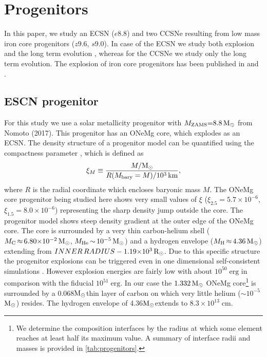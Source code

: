 \documentclass[fleqn,usenatbib]{mnras}
\newcommand{\solr}{\xspace\ensuremath{\rm{R_{\odot}}}}
\newcommand{\solm}{\xspace\ensuremath{\rm{M_{\odot}}}}
\begin{document}
\section{Progenitors}
In this paper, we study an ECSN ($e8.8$) and two  CCSNe resulting from low mass iron core  progenitors ($z9.6$, $s9.0$). In case of the ECSN we study both explosion and the long term evolution , whereas for the CCSNe we study only the long term evolution. The explosion of iron core progenitors has been published in \cite{Melson2015a} and \cite{Melson2019}. 

\subsection{ESCN progenitor}
For this study we use a solar metallicity progenitor with $M_{\rm ZAMS}\mathord{=}8.8\,\solm$ from Nomoto (2017). This progenitor has an ONeMg core, which explodes as an ECSN. The density structure of a progenitor model can be quantified using the compactness parameter \citep{Oconnor2011}, which is defined as
\begin{equation}
\label{equ:compactness}
  \xi_{M} \equiv \frac{M/\solm}{R(M_{\rm bary}=M)/10^{3}\, \rm km},
\end{equation}
where $R$ is the radial coordinate which encloses baryonic mass $M$. The ONeMg core progenitor being studied here shows very small values of $\xi$ ($\xi_{2.5}=5.7\times10^{-6}$, $\xi_{1.5}=8.0\times10^{-6}$)  representing the sharp density jump outside the core. The progenitor model shows steep density gradient at the outer edge of the ONeMg core. The core is surrounded by a very thin carbon-helium shell ($M_{\rm C}\,\mathord{\approx}\, 6.80\mathord{\times}10^{-2}\, \solm$, $M_{\rm He}\,\mathord{\sim}\,10^{-5}\, \solm$) and a hydrogen envelope ($M_{\rm H}\,\mathord{\approx}\, 4.36\, \solm$) extending from $INNER\, RADIUS- \mathord{1.19}\mathord{\times}10^{3}\, \solr$.
Due to this specific structure the progenitor explosions can be triggered even in one dimensional self-consistent simulations \citet{VonGroote, Kitaura2006}. However explosion energies are fairly low with about $10^{50}\;\mathrm{erg}$ in comparison with the fiducial $10^{51}\;\mathrm{erg}$. In our case the $1.332\, \solm$ ONeMg core\footnote{We determine the composition interfaces by the radius at which some element reaches at least half its maximum value. A summary of interface radii and masses is provided in \autoref{tab:progenitors}.} is surrounded by a 0.068\solm thin layer of carbon on which very little helium ($\sim 10^{-5}$\solm) resides. The hydrogen envelope of 4.36\solm extends to $8.3\times10^{13}\;\mathrm{cm}$. 
\end{document}
